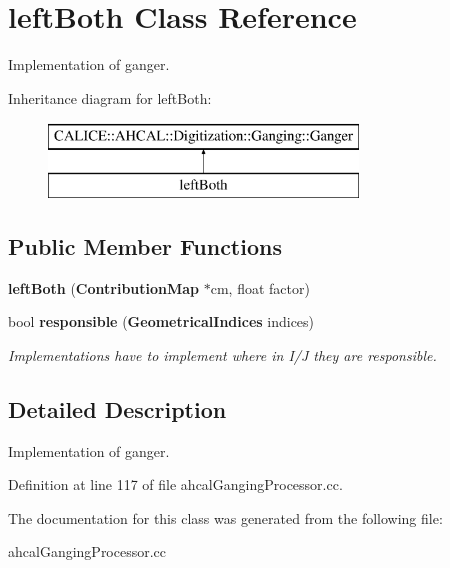 \section{left\-Both Class Reference}
\label{classleftBoth}


Implementation of ganger.  


Inheritance diagram for left\-Both\-:\begin{figure}[H]
\begin{center}
\leavevmode
\includegraphics[height=2.000000cm]{classleftBoth}
\end{center}
\end{figure}
\subsection*{Public Member Functions}
\begin{DoxyCompactItemize}
\item 
{\bfseries left\-Both} ({\bf Contribution\-Map} $\ast$cm, float factor)\label{classleftBoth_a4f652262979a49b0037a956503f00464}

\item 
bool {\bf responsible} ({\bf Geometrical\-Indices} indices)\label{classleftBoth_aae599764d469393fa5e13d5ae54c3855}

\begin{DoxyCompactList}\small\item\em Implementations have to implement where in I/\-J they are responsible. \end{DoxyCompactList}\end{DoxyCompactItemize}


\subsection{Detailed Description}
Implementation of ganger. 

Definition at line 117 of file ahcal\-Ganging\-Processor.\-cc.



The documentation for this class was generated from the following file\-:\begin{DoxyCompactItemize}
\item 
ahcal\-Ganging\-Processor.\-cc\end{DoxyCompactItemize}
